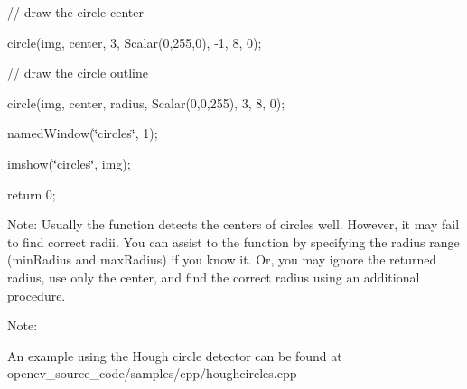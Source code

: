 {\ttfamily }

{\ttfamily }

{\ttfamily // draw the circle center}

{\ttfamily }

{\ttfamily }

{\ttfamily circle(img, center, 3, Scalar(0,255,0), -\/1, 8, 0);}

{\ttfamily }

{\ttfamily }

{\ttfamily // draw the circle outline}

{\ttfamily }

{\ttfamily }

{\ttfamily circle(img, center, radius, Scalar(0,0,255), 3, 8, 0);}

{\ttfamily }

{\ttfamily }

{\ttfamily named\+Window(\char`\"{}circles\char`\"{}, 1);}

{\ttfamily }

{\ttfamily }

{\ttfamily imshow(\char`\"{}circles\char`\"{}, img);}

{\ttfamily }

{\ttfamily }

{\ttfamily return 0;}

{\ttfamily }

{\ttfamily }

{\ttfamily Note\+: Usually the function detects the centers of circles well. However, it may fail to find correct radii. You can assist to the function by specifying the radius range ({\ttfamily min\+Radius} and {\ttfamily max\+Radius}) if you know it. Or, you may ignore the returned radius, use only the center, and find the correct radius using an additional procedure. }

Note\+:


\begin{DoxyItemize}
\item An example using the Hough circle detector can be found at opencv\+\_\+source\+\_\+code/samples/cpp/houghcircles.\+cpp 
\end{DoxyItemize}


